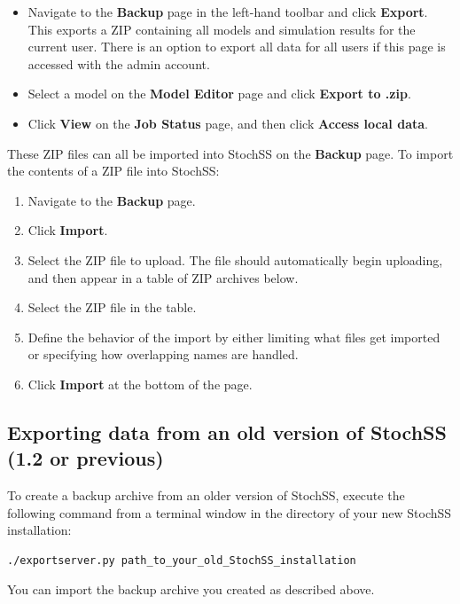 \begin{itemize}
\item Navigate to the \textbf{Backup} page in the left-hand toolbar and click \textbf{Export}. This exports a ZIP containing all models and simulation results for the current user. There is an option to export all data for all users if this page is accessed with the admin account.
\item Select a model on the \textbf{Model Editor} page and click \textbf{Export to .zip}.
\item Click \textbf{View} on the \textbf{Job Status} page, and then click \textbf{Access local data}.
\end{itemize}

These ZIP files can all be imported into StochSS on the \textbf{Backup} page. To import the contents of a ZIP file into StochSS:

\begin{enumerate}
\item Navigate to the \textbf{Backup} page.
\item Click \textbf{Import}.
\item Select the ZIP file to upload. The file should automatically begin uploading, and then appear in a table of ZIP archives below.
\item Select the ZIP file in the table.
\item Define the behavior of the import by either limiting what files get imported or specifying how overlapping names are handled.
\item Click \textbf{Import} at the bottom of the page.
\end{enumerate}

\subsection{Exporting data from an old version of StochSS (1.2 or previous)}
To create a backup archive from an older version of StochSS, execute the following command from a terminal window in the directory of your new StochSS installation:
\begin{verbatim}
./exportserver.py path_to_your_old_StochSS_installation
\end{verbatim}
You can import the backup archive you created as described above.

